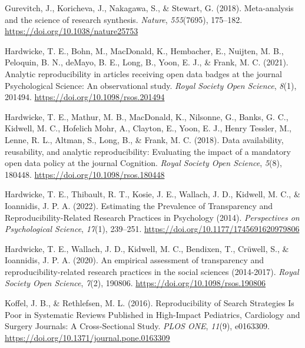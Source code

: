 \documentclass[
  ,jou, a4paper,floatsintext]{apa6}
\newlength{\cslhangindent}
\newlength{\cslentryspacingunit} %
\newenvironment{CSLReferences}[2] %
 {%
  \setlength{\parindent}{0pt}
  \ifodd #1
  \let\oldpar\par
  \def\par{\hangindent=\cslhangindent\oldpar}
  \fi
  \setlength{\parskip}{#2\cslentryspacingunit}
 }%
 {}
\begin{document}
\begin{CSLReferences}{1}{0}
\leavevmode{}%
Gurevitch, J., Koricheva, J., Nakagawa, S., \& Stewart, G. (2018). Meta-analysis and the science of research synthesis. \emph{Nature}, \emph{555}(7695), 175--182. \url{https://doi.org/10.1038/nature25753}

\leavevmode{}%
Hardwicke, T. E., Bohn, M., MacDonald, K., Hembacher, E., Nuijten, M. B., Peloquin, B. N., deMayo, B. E., Long, B., Yoon, E. J., \& Frank, M. C. (2021). Analytic reproducibility in articles receiving open data badges at the journal {Psychological Science}: An observational study. \emph{Royal Society Open Science}, \emph{8}(1), 201494. \url{https://doi.org/10.1098/rsos.201494}

\leavevmode{}%
Hardwicke, T. E., Mathur, M. B., MacDonald, K., Nilsonne, G., Banks, G. C., Kidwell, M. C., Hofelich Mohr, A., Clayton, E., Yoon, E. J., Henry Tessler, M., Lenne, R. L., Altman, S., Long, B., \& Frank, M. C. (2018). Data availability, reusability, and analytic reproducibility: Evaluating the impact of a mandatory open data policy at the journal {Cognition}. \emph{Royal Society Open Science}, \emph{5}(8), 180448. \url{https://doi.org/10.1098/rsos.180448}

\leavevmode{}%
Hardwicke, T. E., Thibault, R. T., Kosie, J. E., Wallach, J. D., Kidwell, M. C., \& Ioannidis, J. P. A. (2022). Estimating the {Prevalence} of {Transparency} and {Reproducibility-Related Research Practices} in {Psychology} (2014). \emph{Perspectives on Psychological Science}, \emph{17}(1), 239--251. \url{https://doi.org/10.1177/1745691620979806}

\leavevmode{}%
Hardwicke, T. E., Wallach, J. D., Kidwell, M. C., Bendixen, T., Crüwell, S., \& Ioannidis, J. P. A. (2020). An empirical assessment of transparency and reproducibility-related research practices in the social sciences (2014-2017). \emph{Royal Society Open Science}, \emph{7}(2), 190806. \url{https://doi.org/10.1098/rsos.190806}

\leavevmode{}%
Koffel, J. B., \& Rethlefsen, M. L. (2016). Reproducibility of {Search} {Strategies} {Is} {Poor} in {Systematic} {Reviews} {Published} in {High}-{Impact} {Pediatrics}, {Cardiology} and {Surgery} {Journals}: {A} {Cross}-{Sectional} {Study}. \emph{PLOS ONE}, \emph{11}(9), e0163309. \url{https://doi.org/10.1371/journal.pone.0163309}


\end{CSLReferences}
\end{document}
